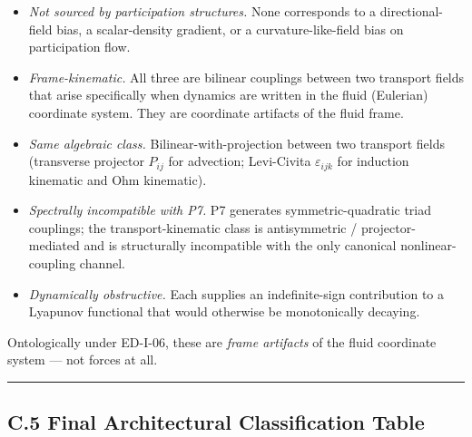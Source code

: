 \documentclass[
  11pt,a4paper]{article}
\providecommand{\tightlist}{%
  \setlength{\itemsep}{0pt}\setlength{\parskip}{0pt}}
\begin{document}
\begin{itemize}
\tightlist
\item
  \emph{Not sourced by participation structures.} None corresponds to a
  directional-field bias, a scalar-density gradient, or a
  curvature-like-field bias on participation flow.
\item
  \emph{Frame-kinematic.} All three are bilinear couplings between two
  transport fields that arise specifically when dynamics are written in
  the fluid (Eulerian) coordinate system. They are coordinate artifacts
  of the fluid frame.
\item
  \emph{Same algebraic class.} Bilinear-with-projection between two
  transport fields (transverse projector \(P_{ij}\) for advection;
  Levi-Civita \(\varepsilon_{ijk}\) for induction kinematic and Ohm
  kinematic).
\item
  \emph{Spectrally incompatible with P7.} P7 generates
  symmetric-quadratic triad couplings; the transport-kinematic class is
  antisymmetric / projector-mediated and is structurally incompatible
  with the only canonical nonlinear-coupling channel.
\item
  \emph{Dynamically obstructive.} Each supplies an indefinite-sign
  contribution to a Lyapunov functional that would otherwise be
  monotonically decaying.
\end{itemize}

Ontologically under ED-I-06, these are \emph{frame artifacts} of the
fluid coordinate system --- not forces at all.

\begin{center}\rule{0.5\linewidth}{0.5pt}\end{center}

\subsection{C.5 Final Architectural Classification
Table}\label{c.5-final-architectural-classification-table}
\end{document}
